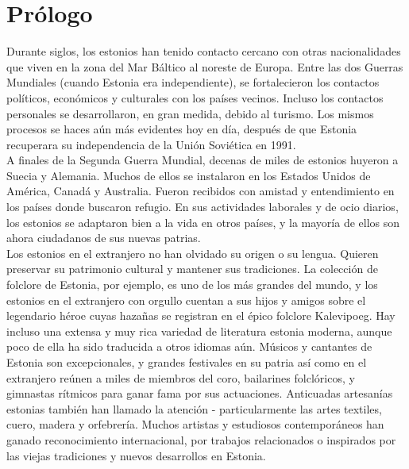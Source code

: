 

\chapter*{Prólogo} %

Durante siglos, los estonios han tenido contacto cercano con otras nacionalidades que viven en la zona del Mar Báltico al noreste de Europa. Entre las dos Guerras Mundiales (cuando Estonia era independiente), se fortalecieron los contactos políticos, económicos y culturales con los países vecinos. Incluso los contactos personales se desarrollaron, en gran medida, debido al turismo. Los mismos procesos se haces aún más evidentes hoy en día, después de que Estonia recuperara su independencia de la Unión Soviética en 1991.\\

A finales de la Segunda Guerra Mundial, decenas de miles de estonios huyeron a Suecia y Alemania. Muchos de ellos se instalaron en los Estados Unidos de América, Canadá y Australia. Fueron recibidos con amistad y entendimiento en los países donde buscaron refugio. En sus actividades laborales y de ocio diarios, los estonios se adaptaron bien a la vida en otros países, y la mayoría de ellos son ahora ciudadanos de sus nuevas patrias.\\

Los estonios en el extranjero no han olvidado su origen o su lengua. Quieren preservar su patrimonio cultural y mantener sus tradiciones. La colección de folclore de Estonia, por ejemplo, es uno de los más grandes del mundo, y los estonios en el extranjero con orgullo cuentan a sus hijos y amigos sobre el legendario héroe cuyas hazañas se registran en el épico folclore Kalevipoeg. Hay incluso una extensa y muy rica variedad de literatura estonia moderna, aunque poco de ella ha sido traducida a otros idiomas aún. Músicos y cantantes de Estonia son excepcionales, y grandes festivales en su patria así como en el extranjero reúnen a miles de miembros del coro, bailarines folclóricos, y gimnastas rítmicos para ganar fama por sus actuaciones. Anticuadas artesanías estonias también han llamado la atención - particularmente las artes textiles, cuero, madera y orfebrería. Muchos artistas y estudiosos contemporáneos han ganado reconocimiento internacional, por trabajos relacionados o inspirados por las viejas tradiciones y nuevos desarrollos en Estonia.\\

